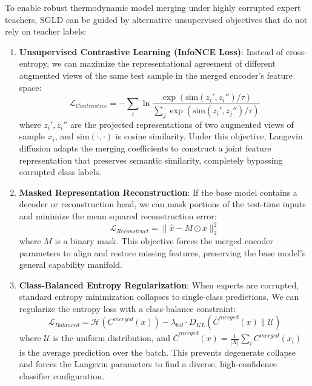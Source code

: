\documentclass{article}
\theoremstyle{plain}
\theoremstyle{definition}
\theoremstyle{remark}
\begin{document}
To enable robust thermodynamic model merging under highly corrupted expert teachers, SGLD can be guided by alternative unsupervised objectives that do not rely on teacher labels:
\begin{enumerate}
    \item \textbf{Unsupervised Contrastive Learning (InfoNCE Loss)}: Instead of cross-entropy, we can maximize the representational agreement of different augmented views of the same test sample in the merged encoder's feature space:
    \begin{equation}
        \mathcal{L}_{Contrastive} = -\sum_{i} \ln \frac{\exp\left(\text{sim}(z_i', z_i'')/\tau\right)}{\sum_j \exp\left(\text{sim}(z_i', z_j'')/\tau\right)}
    \end{equation}
    where $z_i', z_i''$ are the projected representations of two augmented views of sample $x_i$, and $\text{sim}(\cdot, \cdot)$ is cosine similarity. Under this objective, Langevin diffusion adapts the merging coefficients to construct a joint feature representation that preserves semantic similarity, completely bypassing corrupted class labels.
    \item \textbf{Masked Representation Reconstruction}: If the base model contains a decoder or reconstruction head, we can mask portions of the test-time inputs and minimize the mean squared reconstruction error:
    \begin{equation}
        \mathcal{L}_{Reconstruct} = \| \hat{x} - M \odot x \|_2^2
    \end{equation}
    where $M$ is a binary mask. This objective forces the merged encoder parameters to align and restore missing features, preserving the base model's general capability manifold.
    \item \textbf{Class-Balanced Entropy Regularization}: When experts are corrupted, standard entropy minimization collapses to single-class predictions. We can regularize the entropy loss with a class-balance constraint:
    \begin{equation}
        \mathcal{L}_{Balanced} = \mathcal{H}(C^{merged}(x)) - \lambda_{bal} \cdot D_{KL}\left( \bar{C}^{merged}(x) \parallel \mathcal{U} \right)
    \end{equation}
    where $\mathcal{U}$ is the uniform distribution, and $\bar{C}^{merged}(x) = \frac{1}{|X|}\sum_i C^{merged}(x_i)$ is the average prediction over the batch. This prevents degenerate collapse and forces the Langevin parameters to find a diverse, high-confidence classifier configuration.
\end{enumerate}
\end{document}
